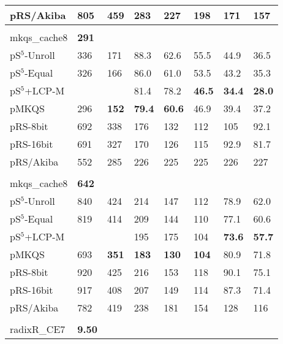 \documentclass[a4paper]{myjournal}
\begin{document}
\begin{table}
\begin{tabularx}{\linewidth}{l|*{7}{>{\hfill}X}|@{}}
    pRS/Akiba & 805 &     459 &     283 &      227 &      198 &      171 &      157 \\ \hline
& \multicolumn{7}{l|}{\textbf{GOV2}, $n = 490\,\text{M}$, $N = 24\,\text{Gi}$, $\frac{D}{N} = 72.4\,\%$} \\ \cline{2-8}
mkqs\_cache8 & \bf 291 &  &  &  &  &  &  \\
pS$^5$-Unroll & 336 &     171 &     88.3 &     62.6 &     55.5 &     44.9 &     36.5 \\
 pS$^5$-Equal & 326 &     166 &     86.0 &     61.0 &     53.5 &     43.2 &     35.3 \\
 pS$^5$+LCP-M &     &         &     81.4 &     78.2 & \bf 46.5 & \bf 34.4 & \bf 28.0 \\
        pMKQS & 296 & \bf 152 & \bf 79.4 & \bf 60.6 &     46.9 &     39.4 &     37.2 \\
     pRS-8bit & 692 &     338 &      176 &      132 &      112 &      105 &     92.1 \\
    pRS-16bit & 691 &     327 &      170 &      126 &      115 &     92.9 &     81.7 \\
    pRS/Akiba & 552 &     285 &      226 &      225 &      225 &      226 &      227 \\ \hline
& \multicolumn{7}{l|}{\textbf{Wikipedia}, $n = N = 1\,\text{Gi}$, $D = 40\,\text{G}$} \\ \cline{2-8}
mkqs\_cache8 & \bf 642 &  &  &  &  &  &  \\
pS$^5$-Unroll & 840 &     424 &     214 &     147 &     112 &     78.9 &     62.0 \\
 pS$^5$-Equal & 819 &     414 &     209 &     144 &     110 &     77.1 &     60.6 \\
 pS$^5$+LCP-M &     &         &     195 &     175 &     104 & \bf 73.6 & \bf 57.7 \\
        pMKQS & 693 & \bf 351 & \bf 183 & \bf 130 & \bf 104 &     80.9 &     71.8 \\
     pRS-8bit & 920 &     425 &     216 &     153 &     118 &     90.1 &     75.1 \\
    pRS-16bit & 917 &     408 &     207 &     149 &     114 &     87.3 &     71.4 \\
    pRS/Akiba & 782 &     419 &     238 &     181 &     154 &      128 &      116 \\ \hline
& \multicolumn{7}{l|}{\textbf{Sinha NoDup} (complete), $n = 31.6\,\text{M}$, $N = 382\,\text{Mi}$, $\frac{D}{N} = 73.4\,\%$} \\ \cline{2-8}
radixR\_CE7 & \bf 9.50 &  &  &  &  &  &  \\

\end{tabularx}
\end{table}
\end{document}
